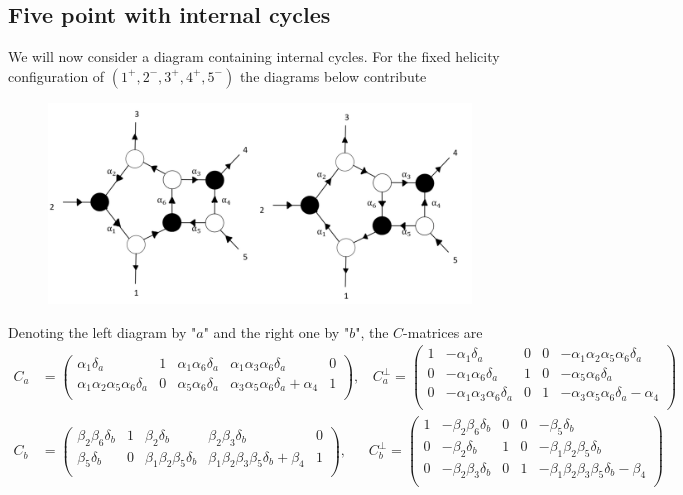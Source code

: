 \documentclass[letter,11pt]{article}
\begin{document}
\subsection{Five point with internal cycles}
We will now consider a diagram containing internal cycles. For the fixed helicity configuration of $(1^+,2^-,3^+,4^+,5^-)$ the diagrams below contribute
\begin{figure}[H]
	\centering
	\includegraphics[width=0.7\linewidth]{5pt3}
	\caption{}
	\label{fig:5pt}
\end{figure}
Denoting the left diagram by "$a$" and the right one by "$b$", the $C$-matrices are
\begin{equation}
	\begin{aligned}
		C_a&=\left(
		\begin{array}{ccccc}
			\alpha _1 \delta_a & 1 & \alpha _1 \alpha _6 \delta_a & \alpha _1 \alpha _3 \alpha _6 \delta_a & 0 \\
	\alpha _1 \alpha _2 \alpha _5 \alpha _6 \delta_a & 0 & \alpha _5 \alpha _6 \delta_a & \alpha _3 \alpha _5 \alpha _6 \delta_a+\alpha _4 & 1 \\
		\end{array}
		\right)
		,~~~~
		C_a^\perp = \left(
		\begin{array}{ccccc}
			1 & -\alpha _1 \delta_a & 0 & 0 & -\alpha _1 \alpha _2 \alpha _5 \alpha _6 \delta_a \\
		0 & -\alpha _1 \alpha _6 \delta_a & 1 & 0 & -\alpha _5 \alpha _6 \delta_a \\
		0 & -\alpha _1 \alpha _3 \alpha _6 \delta_a & 0 & 1 & -\alpha _3 \alpha _5 \alpha _6 \delta_a-\alpha _4 \\
		\end{array}
		\right)\\
		C_b&=\left(
		\begin{array}{ccccc}
			\beta _2 \beta _6 \delta_b & 1 & \beta _2 \delta_b & \beta _2 \beta _3 \delta_b & 0 \\
			\beta _5 \delta_b & 0 & \beta _1 \beta _2 \beta _5 \delta_b & \beta _1 \beta _2 \beta _3 \beta _5 \delta_b+\beta _4 & 1 \\
		\end{array}
		\right),~~~~~~~C_b^\perp =
		\left(
		\begin{array}{ccccc}
			1 & -\beta _2 \beta _6 \delta_b & 0 & 0 & -\beta _5 \delta_b \\
			0 & -\beta _2 \delta_b & 1 & 0 & -\beta _1 \beta _2 \beta _5 \delta_b \\
			0 & -\beta _2 \beta _3 \delta_b & 0 & 1 & -\beta _1 \beta _2 \beta _3 \beta _5 \delta_b -\beta _4 \\
		\end{array}
		\right)
	\end{aligned}
\end{equation}
\end{document}
